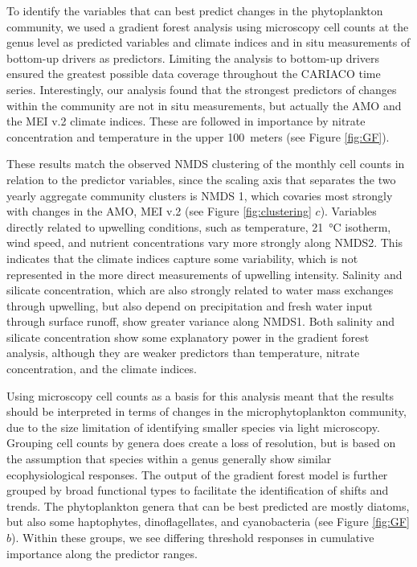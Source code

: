 \documentclass[draft]{agujournal2019}
\begin{document}
To identify the variables that can best predict changes in the phytoplankton community, we used a gradient forest analysis using microscopy cell counts at the genus level as predicted variables and climate indices and in situ measurements of bottom-up drivers as predictors. Limiting the analysis to bottom-up drivers ensured the greatest possible data coverage throughout the CARIACO time series. Interestingly, our analysis found that the strongest predictors of changes within the community are not in situ measurements, but actually the AMO and the MEI v.2 climate indices. These are followed in importance by nitrate concentration and temperature in the upper \qty{100}{meters} (see Figure \ref{fig:GF}).

These results match the observed NMDS clustering of the monthly cell counts in relation to the predictor variables, since the scaling axis that separates the two yearly aggregate community clusters is NMDS 1, which covaries most strongly with changes in the AMO, MEI v.2 (see Figure \ref{fig:clustering} $c$). Variables directly related to upwelling conditions, such as temperature, \qty{21}{\celsius} isotherm, wind speed, and nutrient concentrations vary more strongly along NMDS2. This indicates that the climate indices capture some variability, which is not represented in the more direct measurements of upwelling intensity. Salinity and silicate concentration, which are also strongly related to water mass exchanges through upwelling, but also depend on precipitation and fresh water input through surface runoff, show greater variance along NMDS1. Both salinity and silicate concentration show some explanatory power in the gradient forest analysis, although they are weaker predictors than temperature, nitrate concentration, and the climate indices. 

Using microscopy cell counts as a basis for this analysis meant that the results should be interpreted in terms of changes in the microphytoplankton community, due to the size limitation of identifying smaller species via light microscopy. Grouping cell counts by genera does create a loss of resolution, but is based on the assumption that species within a genus generally show similar ecophysiological responses. The output of the gradient forest model is further grouped by broad functional types to facilitate the identification of shifts and trends. The phytoplankton genera that can be best predicted are mostly diatoms, but also some haptophytes, dinoflagellates, and cyanobacteria (see Figure \ref{fig:GF} $b$). Within these groups, we see differing threshold responses in cumulative importance along the predictor ranges.
\end{document}
